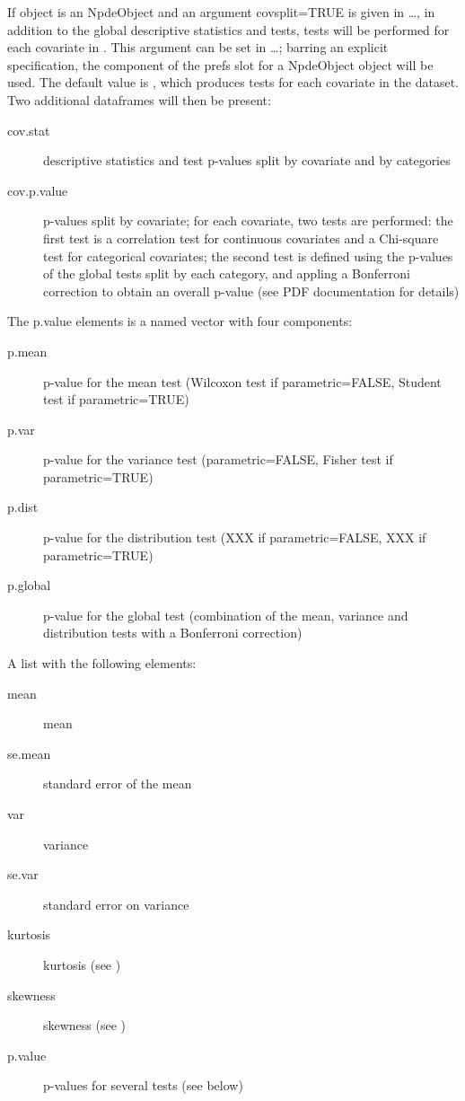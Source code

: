 \documentclass[a4paper]{book}
\begin{document}
\begin{Details}\relax
If object is an NpdeObject and an argument covsplit=TRUE is given in \dots, in addition to the global descriptive statistics and tests, tests will be performed for each covariate in . This argument can be set in \dots; barring an explicit specification, the component  of the prefs slot for a NpdeObject object will be used. The default value is , which produces tests for each covariate in the dataset. Two additional dataframes will then be present:
\begin{description}

\item[cov.stat] descriptive statistics and test p-values split by covariate and by categories
\item[cov.p.value] p-values split by covariate; for each covariate, two tests are performed: the first test is a correlation test for continuous covariates and a Chi-square test for categorical covariates; the second test is defined using the p-values of the global tests split by each category, and appling a Bonferroni correction to obtain an overall p-value (see PDF documentation for details)

\end{description}

The p.value elements is a named vector with four components:
\begin{description}

\item[p.mean] p-value for the mean test (Wilcoxon test if parametric=FALSE, Student test if parametric=TRUE)
\item[p.var] p-value for the variance test (parametric=FALSE, Fisher test if parametric=TRUE)
\item[p.dist] p-value for the distribution test (XXX if parametric=FALSE, XXX if parametric=TRUE)
\item[p.global] p-value for the global test (combination of the mean, variance and distribution tests with a Bonferroni correction)

\end{description}

\end{Details}
%
\begin{Value}
A list with the following elements:
\begin{description}

\item[mean] mean
\item[se.mean] standard error of the mean
\item[var] variance
\item[se.var] standard error on variance
\item[kurtosis] kurtosis (see )
\item[skewness] skewness (see )
\item[p.value] p-values for several tests (see below)

\end{description}

\end{Value}
\end{document}
